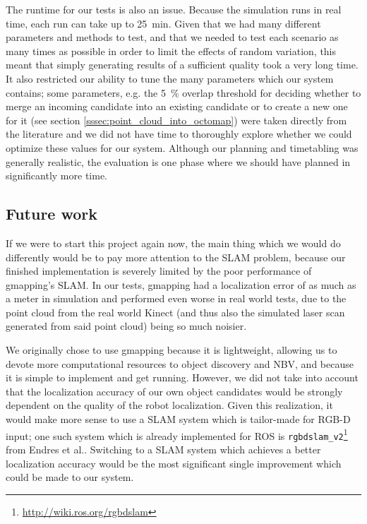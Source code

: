 The runtime for our tests is also an issue. Because the simulation runs in real time, each run can take up to \SI{25}{\minute}.
Given that we had many different parameters and methods to test, and that we needed to test each scenario as many times as possible in order to limit the effects of random variation, this meant that simply generating results of a sufficient quality took a very long time.
It also restricted our ability to tune the many parameters which our system contains; some parameters, e.g. the \SI{5}{\percent} overlap threshold for deciding whether to merge an incoming candidate into an existing candidate or to create a new one for it (see section \ref{sssec:point_cloud_into_octomap}) were taken directly from the literature and we did not have time to thoroughly explore whether we could optimize these values for our system.
Although our planning and timetabling was generally realistic, the evaluation is one phase where we should have planned in significantly more time.

\subsection{Future work}

If we were to start this project again now, the main thing which we would do differently would be to pay more attention to the SLAM problem, because our finished implementation is severely limited by the poor performance of gmapping's SLAM.
In our tests, gmapping had a localization error of as much as a meter in simulation and performed even worse in real world tests, due to the point cloud from the real world Kinect (and thus also the simulated laser scan generated from said point cloud) being so much noisier.

We originally chose to use gmapping because it is lightweight, allowing us to devote more computational resources to object discovery and NBV, and because it is simple to implement and get running.
However, we did not take into account that the localization accuracy of our own object candidates would be strongly dependent on the quality of the robot localization.
Given this realization, it would make more sense to use a SLAM system which is tailor-made for RGB-D input; one such system which is already implemented for ROS is \texttt{rgbdslam\_v2}\footnote{\url{http://wiki.ros.org/rgbdslam}} from Endres et al.\cite{endres2014rgbdslam}.
Switching to a SLAM system which achieves a better localization accuracy would be the most significant single improvement which could be made to our system.

